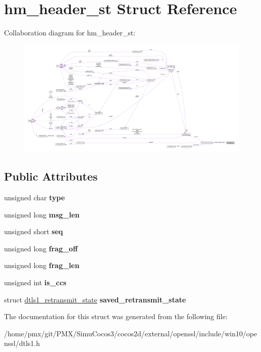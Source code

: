 \hypertarget{structhm__header__st}{}\section{hm\+\_\+header\+\_\+st Struct Reference}
\label{structhm__header__st}


Collaboration diagram for hm\+\_\+header\+\_\+st\+:
\nopagebreak
\begin{figure}[H]
\begin{center}
\leavevmode
\includegraphics[width=350pt]{structhm__header__st__coll__graph}
\end{center}
\end{figure}
\subsection*{Public Attributes}
\begin{DoxyCompactItemize}
\item 
\mbox{\label{structhm__header__st_afd990f37440d11253dd4d6f1cb5f227e}} 
unsigned char {\bfseries type}
\item 
\mbox{\label{structhm__header__st_a0ad9536f7051da82c85e93cd61ac9f19}} 
unsigned long {\bfseries msg\+\_\+len}
\item 
\mbox{\label{structhm__header__st_a724a245fd7883a93da6cf4d701654889}} 
unsigned short {\bfseries seq}
\item 
\mbox{\label{structhm__header__st_a1971b139ea1f6985afdc19d548abe07a}} 
unsigned long {\bfseries frag\+\_\+off}
\item 
\mbox{\label{structhm__header__st_aeabe85e8573ddb4dc5e662daf1d89285}} 
unsigned long {\bfseries frag\+\_\+len}
\item 
\mbox{\label{structhm__header__st_a1443dd84e080fc01e0deabddc8974ec7}} 
unsigned int {\bfseries is\+\_\+ccs}
\item 
\mbox{\label{structhm__header__st_aa53c97a266f1246009cef42c434a6f22}} 
struct \hyperlink{structdtls1__retransmit__state}{dtls1\+\_\+retransmit\+\_\+state} {\bfseries saved\+\_\+retransmit\+\_\+state}
\end{DoxyCompactItemize}


The documentation for this struct was generated from the following file\+:\begin{DoxyCompactItemize}
\item 
/home/pmx/git/\+P\+M\+X/\+Simu\+Cocos3/cocos2d/external/openssl/include/win10/openssl/dtls1.\+h\end{DoxyCompactItemize}
